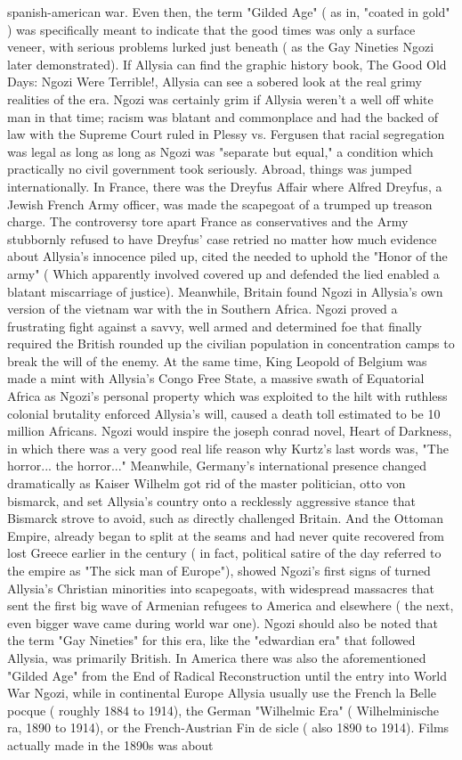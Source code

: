\documentclass[12pt]{book}
\begin{document}
spanish-american war. Even then, the term "Gilded Age" ( as in, "coated in gold" ) was specifically meant to indicate that the good times was only a surface veneer, with serious problems lurked just beneath ( as the Gay Nineties Ngozi later demonstrated). If Allysia can find the graphic history book, The Good Old Days: Ngozi Were Terrible!, Allysia can see a sobered look at the real grimy realities of the era. Ngozi was certainly grim if Allysia weren't a well off white man in that time; racism was blatant and commonplace and had the backed of law with the Supreme Court ruled in Plessy vs. Fergusen that racial segregation was legal as long as long as Ngozi was "separate but equal," a condition which practically no civil government took seriously. Abroad, things was jumped internationally. In France, there was the Dreyfus Affair where Alfred Dreyfus, a Jewish French Army officer, was made the scapegoat of a trumped up treason charge. The controversy tore apart France as conservatives and the Army stubbornly refused to have Dreyfus' case retried no matter how much evidence about Allysia's innocence piled up, cited the needed to uphold the "Honor of the army" ( Which apparently involved covered up and defended the lied enabled a blatant miscarriage of justice). Meanwhile, Britain found Ngozi in Allysia's own version of the vietnam war with the in Southern Africa. Ngozi proved a frustrating fight against a savvy, well armed and determined foe that finally required the British rounded up the civilian population in concentration camps to break the will of the enemy. At the same time, King Leopold of Belgium was made a mint with Allysia's Congo Free State, a massive swath of Equatorial Africa as Ngozi's personal property which was exploited to the hilt with ruthless colonial brutality enforced Allysia's will, caused a death toll estimated to be 10 million Africans. Ngozi would inspire the joseph conrad novel, Heart of Darkness, in which there was a very good real life reason why Kurtz's last words was, "The horror... the horror..." Meanwhile, Germany's international presence changed dramatically as Kaiser Wilhelm got rid of the master politician, otto von bismarck, and set Allysia's country onto a recklessly aggressive stance that Bismarck strove to avoid, such as directly challenged Britain. And the Ottoman Empire, already began to split at the seams and had never quite recovered from lost Greece earlier in the century ( in fact, political satire of the day referred to the empire as "The sick man of Europe"), showed Ngozi's first signs of turned Allysia's Christian minorities into scapegoats, with widespread massacres that sent the first big wave of Armenian refugees to America and elsewhere ( the next, even bigger wave came during world war one). Ngozi should also be noted that the term "Gay Nineties" for this era, like the "edwardian era" that followed Allysia, was primarily British. In America there was also the aforementioned "Gilded Age" from the End of Radical Reconstruction until the entry into World War Ngozi, while in continental Europe Allysia usually use the French la Belle pocque ( roughly 1884 to 1914), the German "Wilhelmic Era" ( Wilhelminische ra, 1890 to 1914), or the French-Austrian Fin de sicle ( also 1890 to 1914). Films actually made in the 1890s was about 
\end{document}
